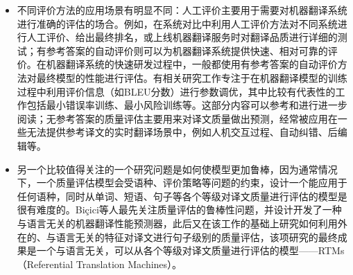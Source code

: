 \begin{itemize}
\vspace{0.5em}
\item 不同评价方法的应用场景有明显不同：人工评价主要用于需要对机器翻译系统进行准确的评估的场合。例如，在系统对比中利用人工评价方法对不同系统进行人工评价、给出最终排名，或上线机器翻译服务时对翻译品质进行详细的测试；有参考答案的自动评价则可以为机器翻译系统提供快速、相对可靠的评价。在机器翻译系统的快速研发过程中，一般都使用有参考答案的自动评价方法对最终模型的性能进行评估。有相关研究工作专注于在机器翻译模型的训练过程中利用评价信息（如BLEU分数）进行参数调优，其中比较有代表性的工作包括最小错误率训练、最小风险训练等。这部分内容可以参考{\chapterseven}和{\chapterthirteen}进行进一步阅读；无参考答案的质量评估主要用来对译文质量做出预测，经常被应用在一些无法提供参考译文的实时翻译场景中，例如人机交互过程、自动纠错、后编辑等。
\vspace{0.5em}
\item 另一个比较值得关注的一个研究问题是如何使模型更加鲁棒，因为通常情况下，一个质量评估模型会受语种、评价策略等问题的约束，设计一个能应用于任何语种，同时从单词、短语、句子等各个等级对译文质量进行评估的模型是很有难度的。Biçici等人最先关注质量评估的鲁棒性问题，并设计开发了一种与语言无关的机器翻译性能预测器，此后又在该工作的基础上研究如何利用外在的、与语言无关的特征对译文进行句子级别的质量评估，该项研究的最终成果是一个与语言无关，可以从各个等级对译文质量进行评估的模型——RTMs（Referential Translation Machines）。
\vspace{0.5em}
\end{itemize}
